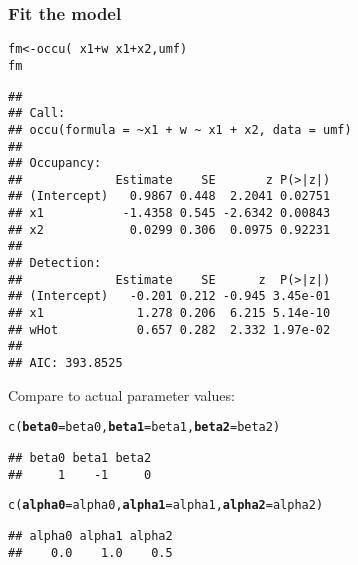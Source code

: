 \documentclass[color=usenames,dvipsnames]{beamer}\usepackage[]{graphicx}\usepackage[]{color}
\makeatletter
\newcommand{\hlopt}[1]{\textcolor[rgb]{0,0,0}{#1}}%
\newcommand{\hlstd}[1]{\textcolor[rgb]{0,0,0}{#1}}%
\newcommand{\hlkwb}[1]{\textcolor[rgb]{0,0.341,0.682}{#1}}%
\newcommand{\hlkwc}[1]{\textcolor[rgb]{0,0,0}{\textbf{#1}}}%
\newcommand{\hlkwd}[1]{\textcolor[rgb]{0.004,0.004,0.506}{#1}}%
\newenvironment{kframe}{%
 \def\at@end@of@kframe{}%
 \ifinner\ifhmode%
  \def\at@end@of@kframe{\end{minipage}}%
  \begin{minipage}{\columnwidth}%
 \fi\fi%
 \def\FrameCommand##1{\hskip\@totalleftmargin \hskip-\fboxsep
 \colorbox{shadecolor}{##1}\hskip-\fboxsep
     \hskip-\linewidth \hskip-\@totalleftmargin \hskip\columnwidth}%
 \MakeFramed {\advance\hsize-\width
   \@totalleftmargin\z@ \linewidth\hsize
   \@setminipage}}%
 {\par\unskip\endMakeFramed%
 \at@end@of@kframe}
\newenvironment{knitrout}{}{} %
\makeatother
\begin{document}
\begin{frame}[fragile]
  \frametitle{Fit the model}
  \footnotesize
\begin{knitrout}\tiny
{}\color{fgcolor}\begin{kframe}
\begin{alltt}
\hlstd{fm} \hlkwb{<-} \hlkwd{occu}\hlstd{(}\hlopt{~}\hlstd{x1}\hlopt{+}\hlstd{w} \hlopt{~}\hlstd{x1}\hlopt{+}\hlstd{x2, umf)}
\hlstd{fm}
\end{alltt}
\begin{verbatim}
## 
## Call:
## occu(formula = ~x1 + w ~ x1 + x2, data = umf)
## 
## Occupancy:
##             Estimate    SE       z P(>|z|)
## (Intercept)   0.9867 0.448  2.2041 0.02751
## x1           -1.4358 0.545 -2.6342 0.00843
## x2            0.0299 0.306  0.0975 0.92231
## 
## Detection:
##             Estimate    SE      z  P(>|z|)
## (Intercept)   -0.201 0.212 -0.945 3.45e-01
## x1             1.278 0.206  6.215 5.14e-10
## wHot           0.657 0.282  2.332 1.97e-02
## 
## AIC: 393.8525
\end{verbatim}
\end{kframe}
\end{knitrout}
\pause
\vfill
Compare to actual parameter values:
\begin{knitrout}\tiny
{}\color{fgcolor}\begin{kframe}
\begin{alltt}
\hlkwd{c}\hlstd{(}\hlkwc{beta0}\hlstd{=beta0,} \hlkwc{beta1}\hlstd{=beta1,} \hlkwc{beta2}\hlstd{=beta2)}
\end{alltt}
\begin{verbatim}
## beta0 beta1 beta2 
##     1    -1     0
\end{verbatim}
\begin{alltt}
\hlkwd{c}\hlstd{(}\hlkwc{alpha0}\hlstd{=alpha0,} \hlkwc{alpha1}\hlstd{=alpha1,} \hlkwc{alpha2}\hlstd{=alpha2)}
\end{alltt}
\begin{verbatim}
## alpha0 alpha1 alpha2 
##    0.0    1.0    0.5
\end{verbatim}
\end{kframe}
\end{knitrout}
\end{frame}
\end{document}
